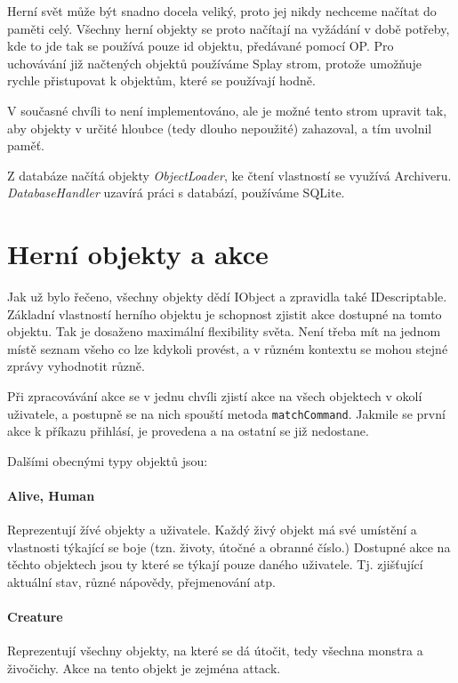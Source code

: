 \documentclass[11pt, a4paper]{article}
\def\class#1{\emph{#1}}
\begin{document}
Herní svět může být snadno docela veliký, proto jej nikdy nechceme načítat do paměti celý. Všechny herní objekty se proto načítají na vyžádání v době potřeby, kde to jde tak se používá pouze id objektu, předávané pomocí OP. Pro uchovávání již načtených objektů používáme Splay strom, protože umožňuje rychle přistupovat k objektům, které se používají hodně.

V současné chvíli to není implementováno, ale je možné tento strom upravit tak, aby objekty v určité hloubce (tedy dlouho nepoužité) zahazoval, a tím uvolnil paměť.

Z databáze načítá objekty \class{ObjectLoader}, ke čtení vlastností se využívá Archiveru. \class{DatabaseHandler} uzavírá práci s databází, používáme SQLite.

\section{Herní objekty a akce}

Jak už bylo řečeno, všechny objekty dědí IObject a zpravidla také IDescriptable. Základní vlastností herního objektu je schopnost zjistit akce dostupné na tomto objektu. Tak je dosaženo maximální flexibility světa. Není třeba mít na jednom místě seznam všeho co lze kdykoli provést, a v různém kontextu se mohou stejné zprávy vyhodnotit různě. 

Při zpracovávání akce se v jednu chvíli zjistí akce na všech objektech v okolí uživatele, a postupně se na nich spouští metoda \texttt{matchCommand}. Jakmile se první akce k příkazu přihlásí, je provedena a na ostatní se již nedostane.

Dalšími obecnými typy objektů jsou:

\paragraph{Alive, Human} Reprezentují žívé objekty a uživatele. Každý živý objekt má své umístění a vlastnosti týkající se boje (tzn. životy, útočné a obranné číslo.) Dostupné akce na těchto objektech jsou ty které se týkají pouze daného uživatele. Tj. zjišťující aktuální stav, různé nápovědy, přejmenování atp.

\paragraph{Creature} Reprezentují všechny objekty, na které se dá útočit, tedy všechna monstra a živočichy. Akce na tento objekt je zejména attack.
\end{document}
